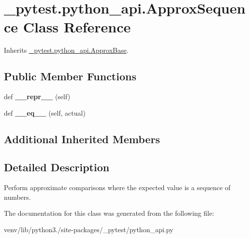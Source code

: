 \hypertarget{class__pytest_1_1python__api_1_1_approx_sequence}{}\section{\+\_\+pytest.\+python\+\_\+api.\+Approx\+Sequence Class Reference}
\label{class__pytest_1_1python__api_1_1_approx_sequence}


Inherits \hyperlink{class__pytest_1_1python__api_1_1_approx_base}{\+\_\+pytest.\+python\+\_\+api.\+Approx\+Base}.

\subsection*{Public Member Functions}
\begin{DoxyCompactItemize}
\item 
\mbox{\label{class__pytest_1_1python__api_1_1_approx_sequence_a11c476787ce7564d13faed43118a7e48}} 
def {\bfseries \+\_\+\+\_\+repr\+\_\+\+\_\+} (self)
\item 
\mbox{\label{class__pytest_1_1python__api_1_1_approx_sequence_a158f7cad328e2a7f9f74349a2952e606}} 
def {\bfseries \+\_\+\+\_\+eq\+\_\+\+\_\+} (self, actual)
\end{DoxyCompactItemize}
\subsection*{Additional Inherited Members}


\subsection{Detailed Description}
\begin{DoxyVerb}Perform approximate comparisons where the expected value is a sequence of
numbers.
\end{DoxyVerb}
 

The documentation for this class was generated from the following file\+:\begin{DoxyCompactItemize}
\item 
venv/lib/python3./site-\/packages/\+\_\+pytest/python\+\_\+api.\+py\end{DoxyCompactItemize}

